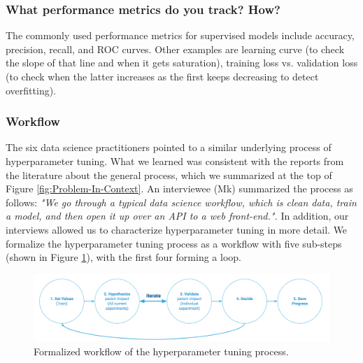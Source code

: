 \documentclass[preprint]{vgtc}        %
\begin{document}
\subsubsection{What performance metrics do you track? How?}
The commonly used performance metrics for supervised models include accuracy, precision, recall, and ROC curves. Other examples are learning curve (to check the slope of that line and when it gets saturation), training loss vs. validation loss (to check when the latter increases as the first keeps decreasing to detect overfitting). 
\subsubsection{Workflow}
The six data science practitioners pointed to a similar underlying process of hyperparameter tuning. What we learned was consistent with the reports from the literature about the general process, which we summarized at the top of Figure \ref{fig:Problem-In-Context}. An interviewee (Mk) summarized the process as follows:
\textit{"We go through a typical data science workflow, which is clean data, train a model, and then open it up over an API to a web front-end.".} 
In addition, our interviews allowed us to characterize hyperparameter tuning in more detail. 
We formalize the hyperparameter tuning process as a workflow with five sub-steps (shown in Figure \ref{fig:workflow}), with the first four forming a loop. 
\begin{figure}
 \includegraphics[width=\textwidth]{pictures/workflow}
 \caption{Formalized workflow of the hyperparameter tuning process.}
 \label{fig:workflow}
\end{figure}
\end{document}
